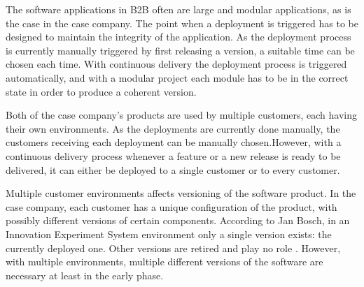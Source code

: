\documentclass[lnbip]{svmultln}
\def\signed#1{{\leavevmode\unskip\nobreak\hfil\penalty50\hskip2em
  \hbox{}\nobreak\hfil\raise-3pt\hbox{(#1)}%
  \parfillskip=0pt \finalhyphendemerits=0 \endgraf}}
\newenvironment{aquote}[1]
  {\savebox\mybox{#1}\begin{quotation}}
  {\signed{\usebox\mybox}\end{quotation}}
\begin{document}
%
The software applications in B2B often are large and modular applications, as is the case in the case company. The point when a deployment is triggered has to be designed to maintain the integrity of the application. As the deployment process is currently manually triggered by first releasing a version, a suitable time can be chosen each time. With continuous delivery the deployment process is triggered automatically, and with a modular project each module has to be in the correct state in order to produce a coherent version.

Both of the case company's products are used by multiple customers, each having their own environments. As the deployments are currently done manually, the customers receiving each deployment can be manually chosen.However, with a continuous delivery process whenever a feature or a new release is ready to be delivered, it can either be deployed to a single customer or to every customer. %

Multiple customer environments affects versioning of the software product. In the case company, each customer has a unique configuration of the product, with possibly different versions of certain components. According to Jan Bosch, in an Innovation Experiment System environment only a single version exists: the currently deployed one. Other versions are retired and play no role \cite{bosch2012building}. However, with multiple environments, multiple different versions of the software are necessary at least in the early phase. %
\end{document}
